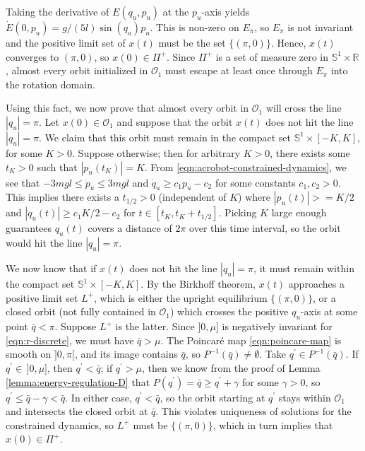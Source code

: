 \documentclass[journal,twoside,web, twocolumn,draftcls]{ieeecolor}
\newcommand*{\R}{\mathbb{R}}
\newcommand*{\Sone}{\mathbb{S}^1}
\newcommand*{\SxR}{\Sone \times \R}
\begin{document}
Taking the derivative of \(E(q_u,p_u)\) at the \(p_u\)-axis yields
\(\dot{E}(0,p_u) = g/(5l) \sin(q_a)p_u\).
This is non-zero on \(E_\pi\), so \(E_\pi\) is not invariant and the positive
limit set of \(x(t)\) must be the set \(\{(\pi,0)\}\). 
Hence, \(x(t)\) converges to \((\pi,0)\), so \(x(0) \in \Pi^+\).
Since \(\Pi^+\) is a set of measure zero in \(\SxR\), almost every orbit
initialized in \(\mathcal{O}_1\) must escape at least once through \(E_\pi\)
into the rotation domain.

Using this fact, we now prove that almost every orbit in \(\mathcal{O}_1\) will
cross the line \(|q_u| = \pi\).
Let \(x(0) \in \mathcal{O}_1\) and suppose that the orbit
\(x(t)\) does not hit the line \(|q_u| = \pi\).
We claim that this orbit must remain in the compact set 
\(\Sone \times [-K,K]\), for some \(K > 0\).
Suppose otherwise;
then for arbitrary \(K > 0\), there exists some \(t_K > 0\) such that
\(|p_u(t_K)| = K\). 
From \eqref{eqn:acrobot-constrained-dynamics},
we see that \(-3mgl \leq \dot{p}_u \leq 3mgl\) and
\(\dot{q}_u \geq c_1 p_u - c_2\) for some constants \(c_1,c_2 > 0\).
This implies there exists a \(t_{1/2} > 0\) (independent of \(K\)) 
where
\(|p_u(t)| >= K/2\) 
and \(|\dot{q}_u(t)| \geq c_1 K/2 - c_2\) 
for \(t \in [t_K, t_K + t_{1/2}]\).
Picking \(K\) large enough guarantees \(q_u(t)\) covers a distance of \(2\pi\)
over this time interval, so the orbit would hit the line \(|q_u| = \pi\).

We now know that if \(x(t)\) does not hit the line \(|q_u| = \pi\),
it must remain within the compact set \(\Sone \times [-K,K]\).
By the Birkhoff theorem, \(x(t)\) approaches a positive limit set \(L^+\), 
which is either the upright equilibrium \(\{(\pi,0)\}\), or
a closed orbit (not fully contained in \(\mathcal{O}_1\))
which crosses the positive \(q_u\)-axis at some point \(\bar{q} < \pi\).
Suppose \(L^+\) is the latter.
Since \(]0,\mu]\) is negatively invariant for \eqref{eqn:r-discrete}, 
we must have \(\bar{q} > \mu\).
The Poincar\'{e} map \eqref{eqn:poincare-map} is smooth on \(]0,\pi[\), and its
image contains \(\bar{q}\), so \(P^{-1}(\bar{q}) \neq \emptyset\).
Take \(q^\prime \in P^{-1}(\bar{q})\). 
If \(q^\prime \in \, ]0,\mu]\), then \(q^\prime < \bar{q}\);
if \(q^\prime > \mu\), then we know 
from the proof of Lemma \ref{lemma:energy-regulation-D} that
\(P(q^\prime) = \bar{q} \geq q^\prime + \gamma\) for some \(\gamma > 0\), 
so \(q^\prime \leq \bar{q} - \gamma < \bar{q}\).
In either case, \(q^\prime < \bar{q}\), so the orbit starting at \(q^\prime\)
stays within \(\mathcal{O}_1\) and intersects the closed orbit at \(\bar{q}\).
This violates uniqueness of solutions for the constrained dynamics,
so \(L^+\) must be \(\{(\pi,0)\}\), which in turn implies that 
\(x(0) \in \Pi^+\).
\end{document}
